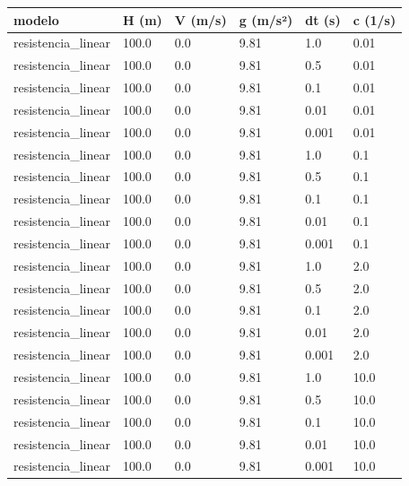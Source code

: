 \begin{tabular}{llllll}
\toprule
modelo & H (m) & V (m/s) & g (m/s²) & dt (s) & c (1/s) \\
\midrule
resistencia\_linear & 100.0 & 0.0 & 9.81 & 1.0 & 0.01 \\
resistencia\_linear & 100.0 & 0.0 & 9.81 & 0.5 & 0.01 \\
resistencia\_linear & 100.0 & 0.0 & 9.81 & 0.1 & 0.01 \\
resistencia\_linear & 100.0 & 0.0 & 9.81 & 0.01 & 0.01 \\
resistencia\_linear & 100.0 & 0.0 & 9.81 & 0.001 & 0.01 \\
resistencia\_linear & 100.0 & 0.0 & 9.81 & 1.0 & 0.1 \\
resistencia\_linear & 100.0 & 0.0 & 9.81 & 0.5 & 0.1 \\
resistencia\_linear & 100.0 & 0.0 & 9.81 & 0.1 & 0.1 \\
resistencia\_linear & 100.0 & 0.0 & 9.81 & 0.01 & 0.1 \\
resistencia\_linear & 100.0 & 0.0 & 9.81 & 0.001 & 0.1 \\
resistencia\_linear & 100.0 & 0.0 & 9.81 & 1.0 & 2.0 \\
resistencia\_linear & 100.0 & 0.0 & 9.81 & 0.5 & 2.0 \\
resistencia\_linear & 100.0 & 0.0 & 9.81 & 0.1 & 2.0 \\
resistencia\_linear & 100.0 & 0.0 & 9.81 & 0.01 & 2.0 \\
resistencia\_linear & 100.0 & 0.0 & 9.81 & 0.001 & 2.0 \\
resistencia\_linear & 100.0 & 0.0 & 9.81 & 1.0 & 10.0 \\
resistencia\_linear & 100.0 & 0.0 & 9.81 & 0.5 & 10.0 \\
resistencia\_linear & 100.0 & 0.0 & 9.81 & 0.1 & 10.0 \\
resistencia\_linear & 100.0 & 0.0 & 9.81 & 0.01 & 10.0 \\
resistencia\_linear & 100.0 & 0.0 & 9.81 & 0.001 & 10.0 \\
\bottomrule
\end{tabular}
